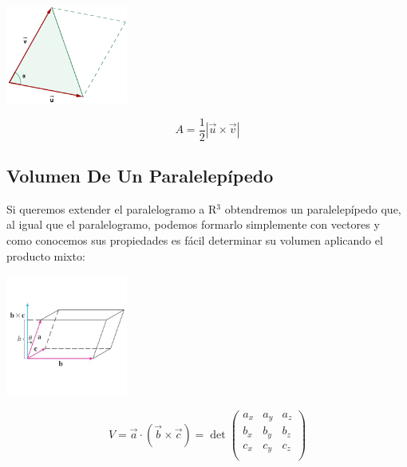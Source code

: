\documentclass{article}
\begin{document}
\begin{center}
\includegraphics[width=4cm]{img/area-triangulo.png}
\end{center}

\[
A = \frac{1}{2}|\vec{u}\times\vec{v}|
\]

\subsection{Volumen De Un Paralelepípedo}
\label{sec:orgb9abb2e}
Si queremos extender el paralelogramo a R\(^{\text{3}}\) obtendremos un paralelepípedo que, al igual que el paralelogramo, podemos formarlo simplemente con vectores y como conocemos sus propiedades es fácil determinar su volumen aplicando el producto mixto:

\begin{center}
\includegraphics[width=4cm]{img/paralelipedo.png}
\end{center}

\[
V = \vec{a}\cdot(\vec{b}\times\vec{c}) = \det\begin{pmatrix}
  a_x & a_y & a_z \\
  b_x & b_y & b_z \\
  c_x & c_y & c_z \\
\end{pmatrix}
\]
\end{document}
